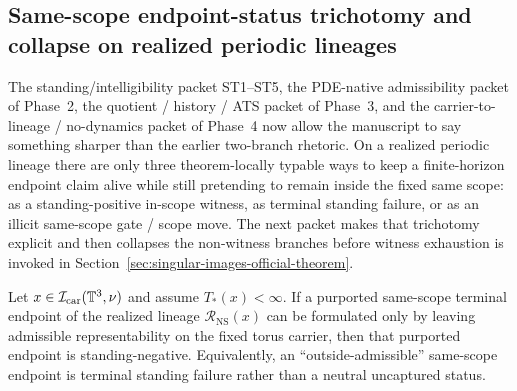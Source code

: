 \subsection{Same-scope endpoint-status trichotomy and collapse on realized periodic lineages}
\label{subsec:same-scope-continuation-failure-dichotomy}
The standing/intelligibility packet ST1--ST5, the PDE-native admissibility packet of Phase~2, the quotient / history / ATS packet of Phase~3, and the carrier-to-lineage / no-dynamics packet of Phase~4 now allow the manuscript to say something sharper than the earlier two-branch rhetoric. On a realized periodic lineage there are only three theorem-locally typable ways to keep a finite-horizon endpoint claim alive while still pretending to remain inside the fixed same scope: as a standing-positive in-scope witness, as terminal standing failure, or as an illicit same-scope gate / scope move. The next packet makes that trichotomy explicit and then collapses the non-witness branches before witness exhaustion is invoked in Section~\ref{sec:singular-images-official-theorem}.

\begin{manualproposition}
\label{prop:exterior-endpoint-standing-failure}
Let $x\in\mathcal I_{\mathrm{car}}(\mathbb{T}^3,\nu)$ and assume $T_*(x)<\infty$. If a purported same-scope terminal endpoint of the realized lineage $\mathcal R_{\mathrm{NS}}(x)$ can be formulated only by leaving admissible representability on the fixed torus carrier, then that purported endpoint is standing-negative. Equivalently, an ``outside-admissible'' same-scope endpoint is terminal standing failure rather than a neutral uncaptured status.
\end{manualproposition}

